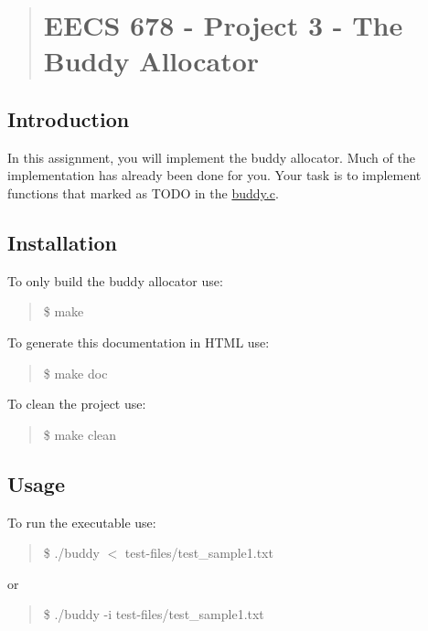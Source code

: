 \begin{quotation}
\section*{E\-E\-C\-S 678 -\/ Project 3 -\/ The Buddy Allocator}



\end{quotation}


\subsection*{Introduction}

In this assignment, you will implement the buddy allocator. Much of the implementation has already been done for you. Your task is to implement functions that marked as T\-O\-D\-O in the \hyperlink{buddy_8c}{buddy.\-c}.

\subsection*{Installation}

To only build the buddy allocator use\-: \begin{quotation}
{\ttfamily \$ make}

\end{quotation}


To generate this documentation in H\-T\-M\-L use\-:

\begin{quotation}
{\ttfamily \$ make doc}

\end{quotation}


To clean the project use\-: \begin{quotation}
{\ttfamily \$ make clean}

\end{quotation}


\subsection*{Usage}

To run the executable use\-: \begin{quotation}
{\ttfamily \$ ./buddy $<$ test-\/files/test\-\_\-sample1.\-txt}

\end{quotation}
or \begin{quotation}
{\ttfamily \$ ./buddy -\/i test-\/files/test\-\_\-sample1.\-txt}

\end{quotation}


